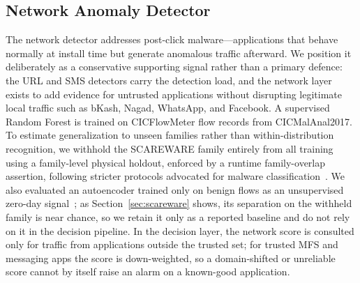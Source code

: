 \documentclass[manuscript,screen,review]{acmart}
\begin{document}
\subsection{Network Anomaly Detector}
The network detector addresses post-click malware---applications that behave normally at install time but generate anomalous traffic afterward. We position it deliberately as a conservative supporting signal rather than a primary defence: the URL and SMS detectors carry the detection load, and the network layer exists to add evidence for untrusted applications without disrupting legitimate local traffic such as bKash, Nagad, WhatsApp, and Facebook. A supervised Random Forest is trained on CICFlowMeter flow records from CICMalAnal2017. To estimate generalization to unseen families rather than within-distribution recognition, we withhold the SCAREWARE family entirely from all training using a family-level physical holdout, enforced by a runtime family-overlap assertion, following stricter protocols advocated for malware classification~\cite{taheri2019,pendlebury2019}. We also evaluated an autoencoder trained only on benign flows as an unsupervised zero-day signal~\cite{sakurada2014}; as Section~\ref{sec:scareware} shows, its separation on the withheld family is near chance, so we retain it only as a reported baseline and do not rely on it in the decision pipeline. In the decision layer, the network score is consulted only for traffic from applications outside the trusted set; for trusted MFS and messaging apps the score is down-weighted, so a domain-shifted or unreliable score cannot by itself raise an alarm on a known-good application.
\end{document}
